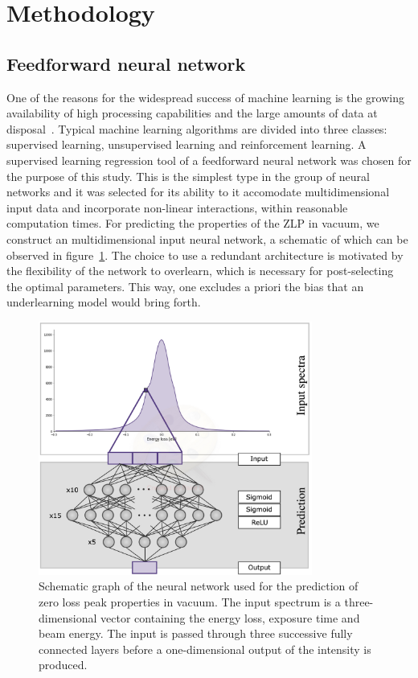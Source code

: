 \section{Methodology}
\label{sec:methodology}

\subsection{Feedforward neural network}

One of the reasons for the widespread success of machine learning 
is the growing availability of high processing capabilities 
and the large amounts of data at disposal~\cite{LeCun:2015}.
%
Typical machine learning algorithms are divided into three classes:
supervised learning, unsupervised learning and reinforcement learning.
%
A supervised learning regression tool of a feedforward neural network 
was chosen for the purpose of this study. This is the simplest type 
in the group of neural networks and it was selected for its ability
to it accomodate multidimensional input data and 
incorporate non-linear interactions, within reasonable computation times. 
%
For predicting the properties of the ZLP in vacuum, we construct an multidimensional
input neural network, a schematic of which can be observed in figure~\ref{fig:architecture}.
The choice to use a redundant architecture is motivated by the flexibility of the network 
to overlearn, which is necessary for post-selecting the optimal parameters.
This way, one excludes a priori the bias that an underlearning model would bring forth. 

\begin{figure}[h]
    \centering
    \includegraphics[width=90mm]{plots/architecture.jpg}
    \caption{Schematic graph of the neural network used for the prediction of zero loss peak properties in vacuum. The input spectrum is a three-dimensional vector containing the energy loss, exposure time and beam energy. The input is passed through three successive fully connected layers before a one-dimensional output of the intensity is produced.}
    \label{fig:architecture}
\end{figure}

